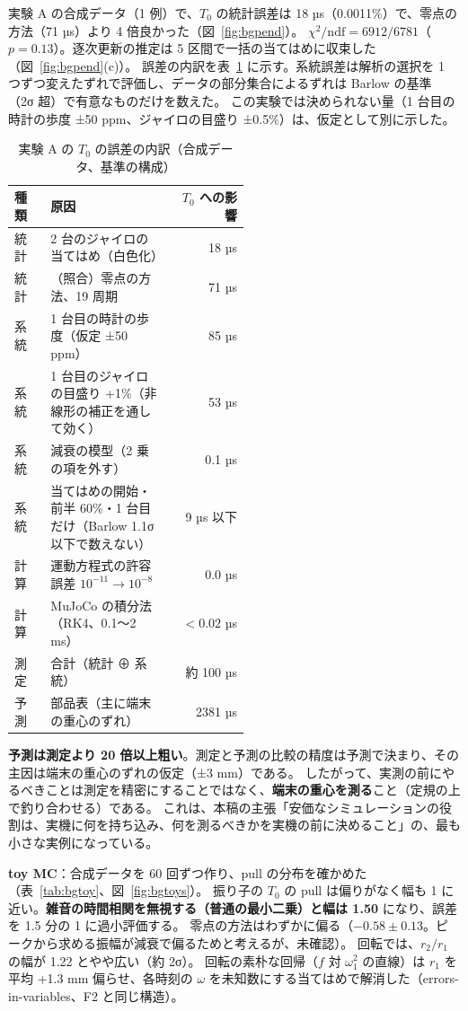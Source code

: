 \documentclass[paper=a4paper,fontsize=10pt,twocolumn,column_gap=2zw,line_length=24zw,number_of_lines=46,head_space=20mm]{jlreq}
\begin{document}
実験 A の合成データ（1 例）で、$T_0$ の統計誤差は 18 µs（0.0011\%）で、零点の方法（71 µs）より 4 倍良かった（図~\ref{fig:bgpend}）。
$\chi^2/\mathrm{ndf} = 6912/6781$（$p=0.13$）。逐次更新の推定は 5 区間で一括の当てはめに収束した（図~\ref{fig:bgpend}(c)）。
誤差の内訳を表~\ref{tab:bangai} に示す。系統誤差は解析の選択を 1 つずつ変えたずれで評価し、データの部分集合によるずれは Barlow の基準 \cite{barlow2002}（2σ 超）で有意なものだけを数えた。
この実験では決められない量（1 台目の時計の歩度 ±50 ppm、ジャイロの目盛り ±0.5\%）は、仮定として別に示した。

\begin{table}[t]\centering\footnotesize
\caption{実験 A の $T_0$ の誤差の内訳（合成データ、基準の構成）}\label{tab:bangai}
\setlength{\tabcolsep}{2.5pt}
\begin{tabular}{lp{0.52\linewidth}r}\toprule
種類 & 原因 & $T_0$ への影響 \\\midrule
統計 & 2 台のジャイロの当てはめ（白色化） & 18 µs \\
統計 & （照合）零点の方法、19 周期 & 71 µs \\
系統 & 1 台目の時計の歩度（仮定 ±50 ppm） & 85 µs \\
系統 & 1 台目のジャイロの目盛り +1\%（非線形の補正を通して効く） & 53 µs \\
系統 & 減衰の模型（2 乗の項を外す） & 0.1 µs \\
系統 & 当てはめの開始・前半 60\%・1 台目だけ（Barlow 1.1σ 以下で数えない） & 9 µs 以下 \\
計算 & 運動方程式の許容誤差 $10^{-11}\to10^{-8}$ & 0.0 µs \\
計算 & MuJoCo の積分法（RK4、0.1〜2 ms） & $<0.02$ µs \\\midrule
測定 & 合計（統計 ⊕ 系統） & 約 100 µs \\
予測 & 部品表（主に端末の重心のずれ） & 2381 µs \\\bottomrule
\end{tabular}
\end{table}

\textbf{予測は測定より 20 倍以上粗い}。測定と予測の比較の精度は予測で決まり、その主因は端末の重心のずれの仮定（±3 mm）である。
したがって、実測の前にやるべきことは測定を精密にすることではなく、\textbf{端末の重心を測る}こと（定規の上で釣り合わせる）である。
これは、本稿の主張「安価なシミュレーションの役割は、実機に何を持ち込み、何を測るべきかを実機の前に決めること」の、最も小さな実例になっている。

\textbf{toy MC}：合成データを 60 回ずつ作り、pull の分布を確かめた（表~\ref{tab:bgtoy}、図~\ref{fig:bgtoys}）。
振り子の $T_0$ の pull は偏りがなく幅も 1 に近い。\textbf{雑音の時間相関を無視する（普通の最小二乗）と幅は 1.50} になり、誤差を 1.5 分の 1 に過小評価する。
零点の方法はわずかに偏る（$-0.58\pm0.13$。ピークから求める振幅が減衰で偏るためと考えるが、未確認）。
回転では、$r_2/r_1$ の幅が 1.22 とやや広い（約 2σ）。
回転の素朴な回帰（$f$ 対 $\omega_1^2$ の直線）は $r_1$ を平均 +1.3 mm 偏らせ、各時刻の $\omega$ を未知数にする当てはめで解消した（errors-in-variables、F2 と同じ構造）。
\end{document}
